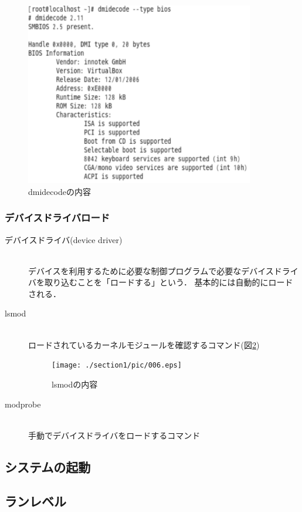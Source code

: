 \begin{figure}[!h]
	\begin{center}
		\includegraphics[width=10cm]{./section1/pic/005.eps}
		\caption{dmidecodeの内容}
		\label{005}
	\end{center}
\end{figure}

\clearpage
\subsubsection{デバイスドライバロード}
\begin{description}
	\item[デバイスドライバ(device driver)]\mbox{}\\
	デバイスを利用するために必要な制御プログラムで必要なデバイスドライバを取り込むことを「ロードする」という．
	基本的には自動的にロードされる．
	\item[lsmod]\mbox{}\\
	ロードされているカーネルモジュールを確認するコマンド(図\ref{006})
		\begin{figure}[!h]
			\begin{center}
				\texttt{[image: ./section1/pic/006.eps]}
				\caption{lsmodの内容}
				\label{006}
			\end{center}
		\end{figure}
	\item[modprobe]\mbox{}\\
	手動でデバイスドライバをロードするコマンド
\end{description}


\clearpage
\subsection{システムの起動}
\subsection{ランレベル}